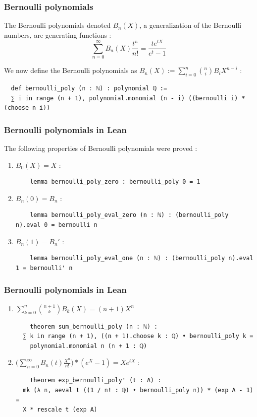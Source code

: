 \documentclass{beamer}
\begin{document}
\begin{frame}[fragile]
\frametitle{Bernoulli polynomials}
The Bernoulli polynomials denoted $B_n(X)$, a generalization of the Bernoulli numbers,
are generating functions :
$$ \sum_{n = 0}^{\infty} B_n(X) \frac{t^n}{n!} = \frac{t e^{tX}}{e^t - 1} $$ \pause

We now define the Bernoulli polynomials as
$ B_n(X) := \sum_{i = 0}^{n} {n \choose i} B_i X^{n - i} $ :
\begin{lstlisting}
  def bernoulli_poly (n : ℕ) : polynomial ℚ :=
  ∑ i in range (n + 1), polynomial.monomial (n - i) ((bernoulli i) * (choose n i))
\end{lstlisting}
\end{frame}

\begin{frame}[fragile]
\frametitle{Bernoulli polynomials in Lean}
The following properties of Bernoulli polynomials were proved :
\begin{enumerate}
  \item $ B_0(X) = X $ : \begin{lstlisting}
    lemma bernoulli_poly_zero : bernoulli_poly 0 = 1
  \end{lstlisting} \pause
  \item $ B_n(0) = B_n $ : \begin{lstlisting}
    lemma bernoulli_poly_eval_zero (n : ℕ) : (bernoulli_poly n).eval 0 = bernoulli n
  \end{lstlisting} \pause
  \item $ B_n(1) = B_n' $ : \begin{lstlisting}
    lemma bernoulli_poly_eval_one (n : ℕ) : (bernoulli_poly n).eval 1 = bernoulli' n
  \end{lstlisting}
\end{enumerate}
\end{frame}

\begin{frame}[fragile]
\frametitle{Bernoulli polynomials in Lean}
  \begin{enumerate}
  \item $\sum_{k = 0}^n {{n + 1} \choose k} B_k(X) = (n + 1) X^n $
  \begin{lstlisting}
    theorem sum_bernoulli_poly (n : ℕ) :
  ∑ k in range (n + 1), ((n + 1).choose k : ℚ) • bernoulli_poly k =
    polynomial.monomial n (n + 1 : ℚ)
  \end{lstlisting} \pause
  \item $ \bigg( \sum_{n = 0}^{\infty} B_n(t) \frac{X^n}{n!} \bigg) * (e^X - 1) = X e^{tX} $ :
  \begin{lstlisting}
    theorem exp_bernoulli_poly' (t : A) :
  mk (λ n, aeval t ((1 / n! : ℚ) • bernoulli_poly n)) * (exp A - 1) =
  X * rescale t (exp A)
  \end{lstlisting}
\end{enumerate}
\end{frame}
\end{document}

